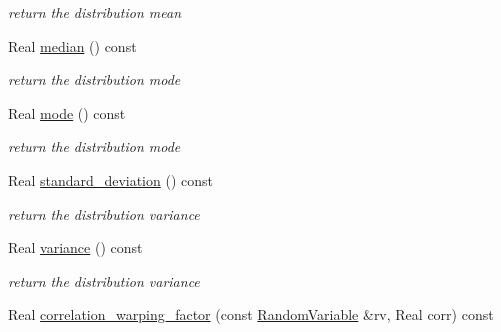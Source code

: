 \begin{DoxyCompactItemize}
\begin{DoxyCompactList}\small\item\em return the distribution mean \end{DoxyCompactList}\item 
Real \hyperlink{classPecos_1_1GammaRandomVariable_ae1fff19ce29a79d657043a598523635d}{median} () const \label{classPecos_1_1GammaRandomVariable_ae1fff19ce29a79d657043a598523635d}

\begin{DoxyCompactList}\small\item\em return the distribution mode \end{DoxyCompactList}\item 
Real \hyperlink{classPecos_1_1GammaRandomVariable_a72d3d6926edd929cb3f8e12baa655f70}{mode} () const \label{classPecos_1_1GammaRandomVariable_a72d3d6926edd929cb3f8e12baa655f70}

\begin{DoxyCompactList}\small\item\em return the distribution mode \end{DoxyCompactList}\item 
Real \hyperlink{classPecos_1_1GammaRandomVariable_a6a4ed9624d511f8a4e4f509c82cb0706}{standard\+\_\+deviation} () const \label{classPecos_1_1GammaRandomVariable_a6a4ed9624d511f8a4e4f509c82cb0706}

\begin{DoxyCompactList}\small\item\em return the distribution variance \end{DoxyCompactList}\item 
Real \hyperlink{classPecos_1_1GammaRandomVariable_a4b8b05b2a9af92dad9cc304c2925a4eb}{variance} () const \label{classPecos_1_1GammaRandomVariable_a4b8b05b2a9af92dad9cc304c2925a4eb}

\begin{DoxyCompactList}\small\item\em return the distribution variance \end{DoxyCompactList}\item 
Real \hyperlink{classPecos_1_1GammaRandomVariable_a9ee48b3ca93459136b2e73f77873c4aa}{correlation\+\_\+warping\+\_\+factor} (const \hyperlink{classPecos_1_1RandomVariable}{Random\+Variable} \&rv, Real corr) const \label{classPecos_1_1GammaRandomVariable_a9ee48b3ca93459136b2e73f77873c4aa}


\end{DoxyCompactItemize}
